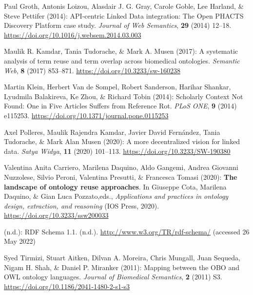 \begin{thebibliography}{9}
Paul Groth, Antonis Loizou, Alasdair J. G. Gray, Carole Goble, Lee
Harland, \& Steve Pettifer (2014): {API-centric Linked Data}
integration: {The Open PHACTS Discovery Platform} case study.
\emph{Journal of Web Semantics}, \textbf{29} (2014) 12--18.
\url{https://doi.org/10.1016/j.websem.2014.03.003}

Maulik R. Kamdar, Tania Tudorache, \& Mark A. Musen (2017): A systematic
analysis of term reuse and term overlap across biomedical ontologies.
\emph{Semantic Web}, \textbf{8} (2017) 853--871.
\url{https://doi.org/10.3233/sw-160238}

Martin Klein, Herbert Van de Sompel, Robert Sanderson, Harihar Shankar,
Lyudmila Balakireva, Ke Zhou, \& Richard Tobin (2014): Scholarly
{Context Not Found}: {One} in {Five Articles Suffers} from {Reference
Rot}. \emph{PLoS ONE}, \textbf{9} (2014) e115253.
\url{https://doi.org/10.1371/journal.pone.0115253}

Axel Polleres, Maulik Rajendra Kamdar, Javier David Fernández, Tania
Tudorache, \& Mark Alan Musen (2020): A more decentralized vision for
linked data. \emph{Satya Widya}, \textbf{11} (2020) 101--113.
\url{https://doi.org/10.3233/SW-190380}

Valentina Anita Carriero, Marilena Daquino, Aldo Gangemi, Andrea
Giovanni Nuzzolese, Silvio Peroni, Valentina Presutti, \& Francesca
Tomasi (2020): \textbf{The landscape of ontology reuse approaches}. In
Giuseppe Cota, Marilena Daquino, \& Gian Luca Pozzato,eds.,
\emph{Applications and practices in ontology design, extraction, and
reasoning} ({IOS Press}, 2020).
\url{https://doi.org/10.3233/ssw200033}

(n.d.): {RDF Schema} 1.1. (n.d.). \url{http://www.w3.org/TR/rdf-schema/}
(accessed 26 May 2022)

Syed Tirmizi, Stuart Aitken, Dilvan A. Moreira, Chris Mungall, Juan
Sequeda, Nigam H. Shah, \& Daniel P. Miranker (2011): Mapping between
the {OBO} and {OWL} ontology languages. \emph{Journal of Biomedical
Semantics}, \textbf{2} (2011) S3.
\url{https://doi.org/10.1186/2041-1480-2-s1-s3}


\end{thebibliography}
